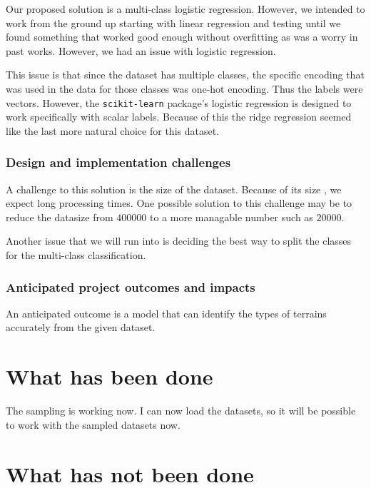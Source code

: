 \documentclass[11pt]{report}
\begin{document}
Our proposed solution is a multi-class logistic regression.
However, we intended to work from the ground up
starting with linear regression
and testing until we found something that worked good enough
without overfitting
as was a worry in past works.
However, we had an issue with logistic regression.

This issue is that since the dataset has multiple classes,
the specific encoding that was used in the data for those classes was one-hot encoding.
Thus the labels were vectors.
However, the \texttt{scikit-learn} package's logistic regression is designed to work specifically with scalar labels.
Because of this the ridge regression seemed like the last more natural choice for this dataset.

\subsubsection{Design and implementation challenges}

A challenge to this solution is the size of the dataset.
Because of its size , we expect long processing times.
One possible solution to this challenge may be to reduce the datasize
from \(\num{400000}\) to a more managable number such as
\(\num{20000}\).

Another issue that we will run into is deciding the best way to split the classes for the multi-class classification.

\subsubsection{Anticipated project outcomes and impacts}

An anticipated outcome is a model that can identify the types of terrains accurately from the given dataset.



\section{What has been done}

The sampling is working now.
I can now load the datasets,
so it will be possible to work with the sampled datasets now.

\section{What has not been done}
\end{document}
